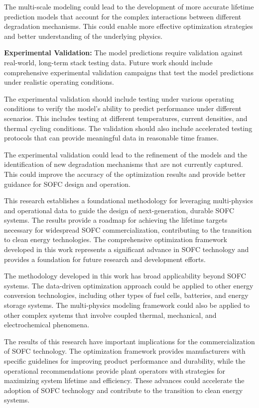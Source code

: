 \documentclass[conference]{IEEEtran}
\begin{document}
The multi-scale modeling could lead to the development of more accurate lifetime prediction models that account for the complex interactions between different degradation mechanisms. This could enable more effective optimization strategies and better understanding of the underlying physics.

\textbf{Experimental Validation:} The model predictions require validation against real-world, long-term stack testing data. Future work should include comprehensive experimental validation campaigns that test the model predictions under realistic operating conditions.

The experimental validation should include testing under various operating conditions to verify the model's ability to predict performance under different scenarios. This includes testing at different temperatures, current densities, and thermal cycling conditions. The validation should also include accelerated testing protocols that can provide meaningful data in reasonable time frames.

The experimental validation could lead to the refinement of the models and the identification of new degradation mechanisms that are not currently captured. This could improve the accuracy of the optimization results and provide better guidance for SOFC design and operation.

This research establishes a foundational methodology for leveraging multi-physics and operational data to guide the design of next-generation, durable SOFC systems. The results provide a roadmap for achieving the lifetime targets necessary for widespread SOFC commercialization, contributing to the transition to clean energy technologies. The comprehensive optimization framework developed in this work represents a significant advance in SOFC technology and provides a foundation for future research and development efforts.

The methodology developed in this work has broad applicability beyond SOFC systems. The data-driven optimization approach could be applied to other energy conversion technologies, including other types of fuel cells, batteries, and energy storage systems. The multi-physics modeling framework could also be applied to other complex systems that involve coupled thermal, mechanical, and electrochemical phenomena.

The results of this research have important implications for the commercialization of SOFC technology. The optimization framework provides manufacturers with specific guidelines for improving product performance and durability, while the operational recommendations provide plant operators with strategies for maximizing system lifetime and efficiency. These advances could accelerate the adoption of SOFC technology and contribute to the transition to clean energy systems.
\end{document}
